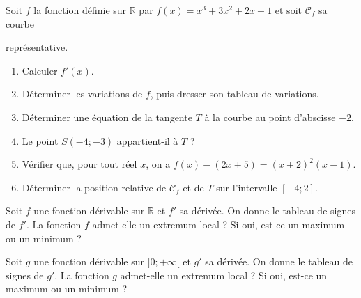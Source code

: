 \documentclass[11pt]{article}
\begin{document}
\begin{exo}
Soit $f$ la fonction définie sur $\mathbb{R}$ par
$f(x)=x^3+3x^2+2x+1$ et soit $\mathscr C_f$ sa courbe\\[1mm]
\begin{minipage}{.75\textwidth}
représentative.
\begin{enumerate}
  \item Calculer $f'(x)$.
  \item Déterminer les variations de $f$, puis dresser son tableau de variations.
  \item Déterminer une équation de la tangente $T$ à la courbe au point
    d'abscisse $-2$.
  \item Le point $S(-4;-3)$ appartient-il à $T$ ?
  \item Vérifier que, pour tout réel $x$, on a $f(x)-(2x+5)=(x+2)^2(x-1)$.
  \item Déterminer la position relative de $\mathscr C_f$ et de $T$ sur
    l'intervalle $[-4;2]$.
\end{enumerate}
\end{minipage}
\begin{minipage}{.25\textwidth}
  \begin{center}
  \end{center}
\end{minipage}
\end{exo}

\begin{exo}
Soit $f$ une fonction dérivable sur $\mathbb{R}$ et $f'$ sa dérivée. On donne le
tableau de signes de $f'$. La fonction $f$ admet-elle un extremum local ? Si
oui, est-ce un maximum ou un minimum ?
\begin{center}
\end{center}
\end{exo}

\begin{exo}
Soit $g$ une fonction dérivable sur $]0;+\infty[$ et $g'$ sa dérivée. On donne le
tableau de signes de $g'$. La fonction $g$ admet-elle un extremum local ? Si
oui, est-ce un maximum ou un minimum ?
\begin{center}
\end{center}
\end{exo}
\end{document}
